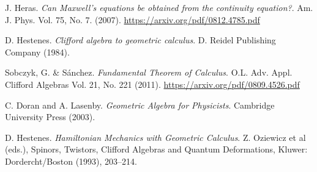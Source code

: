 \documentclass[twocolumn]{article}
\begin{document}
  \begin{thebibliography}{9} 

      J. Heras.
      \emph{Can Maxwell’s equations be obtained from the continuity equation?}.
      Am. J. Phys. Vol. 75, No. 7. (2007).
      \url{https://arxiv.org/pdf/0812.4785.pdf}


      D. Hestenes.
      \emph{Clifford algebra to geometric calculus}.
      D. Reidel Publishing Company (1984).

      Sobczyk, G. \& S\'anchez.
      \emph{Fundamental Theorem of Calculus}.
      O.L. Adv. Appl. Clifford Algebras Vol. 21, No. 221 (2011).
      \url{https://arxiv.org/pdf/0809.4526.pdf}

      C. Doran and A. Lasenby.
      \emph{Geometric Algebra for Physicists}. Cambridge University Press (2003).




      D. Hestenes.
      \emph{Hamiltonian Mechanics with Geometric Calculus}.
       Z. Oziewicz et al (eds.), Spinors, Twistors, Clifford Algebras and Quantum Deformations, Kluwer: Dordercht/Boston (1993), 203–214.


  \end{thebibliography}
\end{document}
